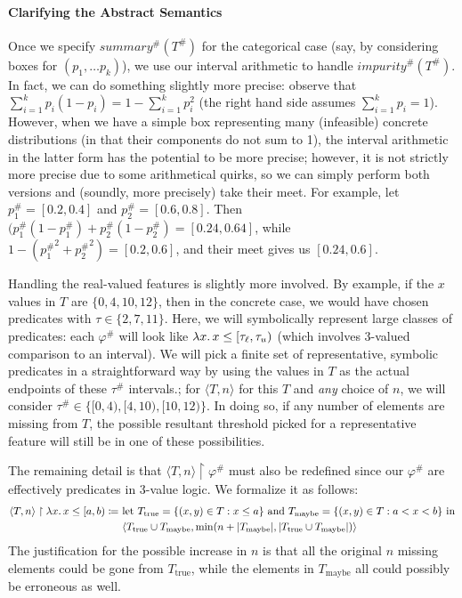 \paragraph{Clarifying the Abstract Semantics}

Once we specify $\mathit{summary}^\#(T^\#)$ for the categorical case
(say, by considering boxes for $(p_1, \ldots p_k)$),
we use our interval arithmetic to handle $\mathit{impurity}^\#(T^\#)$.
In fact, we can do something slightly more precise:
observe that $\sum_{i=1}^k p_i (1 - p_i) = 1 - \sum_{i=1}^k p_i^2$
(the right hand side assumes $\sum_{i=1}^k p_i = 1$).
However, when we have a simple box representing many (infeasible) concrete distributions
(in that their components do not sum to 1),
the interval arithmetic in the latter form has the potential to be more precise;
however, it is not strictly more precise due to some arithmetical quirks,
so we can simply perform both versions and (soundly, more precisely) take their meet.
For example, let $p_1^\# = [0.2, 0.4]$ and $p_2^\# = [0.6, 0.8]$.
Then $(p_1^\# (1 - p_1^\#) + p_2^\# (1 - p_2^\#) = [0.24, 0.64]$,
while $1 - ({p_1^\#}^2 + {p_2^\#}^2) = [0.2, 0.6]$,
and their meet gives us $[0.24, 0.6]$.

Handling the real-valued features is slightly more involved.
By example, if the $x$ values in $T$ are $\{0, 4, 10, 12\}$, then in the concrete case,
we would have chosen predicates with $\tau \in \{2, 7, 11\}$.
Here, we will symbolically represent large classes of predicates:
each $\varphi^\#$ will look like $\lambda x \ldotp x \leq [\tau_\ell, \tau_u)$
(which involves 3-valued comparison to an interval).
We will pick a finite set of representative, symbolic predicates in a straightforward way
by using the values in $T$ as the actual endpoints of these $\tau^\#$ intervals.;
for $\langle T, n \rangle$ for this $T$ and \emph{any} choice of $n$, we will consider
$\tau^\# \in \{[0, 4), [4, 10), [10, 12)\}$.
In doing so, if any number of elements are missing from $T$, the possible resultant threshold
picked for a representative feature
will still be in one of these possibilities.

The remaining detail is that $\langle T, n \rangle \upharpoonright \varphi^\#$
must also be redefined since our $\varphi^\#$ are effectively predicates in 3-value logic.
We formalize it as follows:
\begin{align*}
    \langle T, n \rangle \upharpoonright \lambda x \ldotp x \leq [a, b)
    \coloneqq&~
    \text{let } T_\text{true} = \{(x,y) \in T : x \leq a\} \text{ and }
    T_\text{maybe} = \{(x,y) \in T : a < x < b\} \text{ in} \\
    &~\langle T_\text{true} \cup T_\text{maybe},
    \min(n + |T_\text{maybe}|, |T_\text{true} \cup T_\text{maybe}| ) \rangle
\end{align*}
The justification for the possible increase in $n$ is that all the original $n$ missing elements
could be gone from $T_\text{true}$,
while the elements in $T_\text{maybe}$ all could possibly be erroneous as well.
